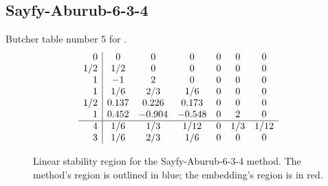 \documentclass[letterpaper,10pt,english]{sphinxmanual}
\begin{document}
\subsection{Sayfy-Aburub-6-3-4}
\label{Butcher:butcher-sayfy-aburub}\label{Butcher:sayfy-aburub-6-3-4}
Butcher table number 5
for {\hyperref[c_interface/User_callable:ARKodeSetERKTableNum]{}}.
\begin{gather}
\begin{split}\begin{array}{r|cccccc}
  0 & 0 & 0 & 0 & 0 & 0 & 0 \\
  1/2 & 1/2 & 0 & 0 & 0 & 0 & 0 \\
  1 & -1 & 2 & 0 & 0 & 0 & 0 \\
  1 & 1/6 & 2/3 & 1/6 & 0 & 0 & 0 \\
  1/2 & 0.137 & 0.226 & 0.173 & 0 & 0 & 0 \\
  1 & 0.452 & -0.904 & -0.548 & 0 & 2 & 0 \\
  \hline
  4 & 1/6 & 1/3 & 1/12 & 0 & 1/3 & 1/12 \\
  3 & 1/6 & 2/3 & 1/6 & 0 & 0 & 0
\end{array}\end{split}\notag
\end{gather}\begin{figure}[htbp]
\centering
\capstart

\caption{Linear stability region for the Sayfy-Aburub-6-3-4 method.  The method's
region is outlined in blue; the embedding's region is in red.}\end{figure}
\end{document}
